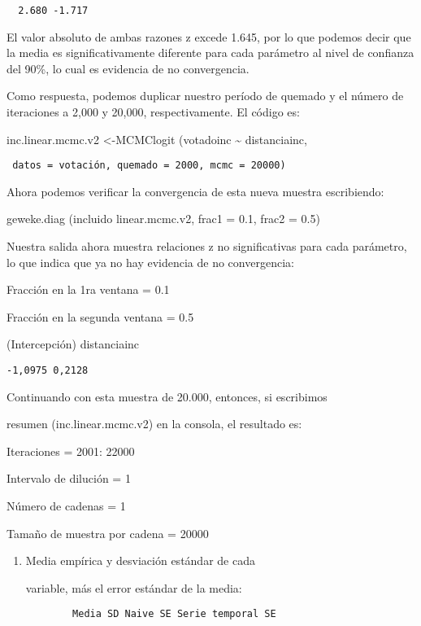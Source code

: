 \documentclass[
]{book}
\begin{document}
\begin{verbatim}
  2.680 -1.717
\end{verbatim}

El valor absoluto de ambas razones z excede 1.645, por lo que podemos decir que la media es significativamente diferente para cada parámetro al nivel de confianza del 90\%, lo cual es evidencia de no convergencia.

Como respuesta, podemos duplicar nuestro período de quemado y el número de iteraciones a 2,000 y 20,000, respectivamente. El código es:

inc.linear.mcmc.v2 \textless-MCMClogit (votadoinc \textasciitilde{} distanciainc,

\begin{verbatim}
 datos = votación, quemado = 2000, mcmc = 20000)
\end{verbatim}

Ahora podemos verificar la convergencia de esta nueva muestra escribiendo:

geweke.diag (incluido linear.mcmc.v2, frac1 = 0.1, frac2 = 0.5)

Nuestra salida ahora muestra relaciones z no significativas para cada parámetro, lo que indica que ya no hay evidencia de no convergencia:

Fracción en la 1ra ventana = 0.1

Fracción en la segunda ventana = 0.5

(Intercepción) distanciainc

\begin{verbatim}
-1,0975 0,2128
\end{verbatim}

Continuando con esta muestra de 20.000, entonces, si escribimos

resumen (inc.linear.mcmc.v2) en la consola, el resultado es:

Iteraciones = 2001: 22000

Intervalo de dilución = 1

Número de cadenas = 1

Tamaño de muestra por cadena = 20000

\begin{enumerate}
\def\labelenumi{\arabic{enumi}.}
\item
  Media empírica y desviación estándar de cada

  variable, más el error estándar de la media:

\begin{verbatim}
        Media SD Naive SE Serie temporal SE
\end{verbatim}
\end{enumerate}
\end{document}
